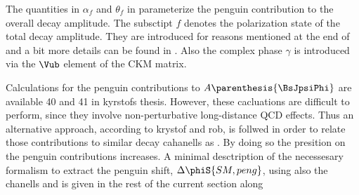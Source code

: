 \noindent The quantities in $\alpha_f$ and $\theta_f$ in  parameterize the penguin contribution to the overall \BsJpsiPhi
decay amplitude. The subsctipt $f$ denotes the polarization state of the total decay amplitude. They are introduced for reasons mentioned at the end
of  and a bit more details can be found in .
Also the complex phase $\gamma$ is introduced via the $\Vub$ element of the CKM matrix.

Calculations for the penguin contributions to $A \parenthesis{\BsJpsiPhi}$ are available {\color{red} 40 and 41 in kyrstofs thesis}.
However, these cacluations are difficult to perform, since they involve non-perturbative long-distance QCD effects. Thus an alternative
approach, according to {\color{red} krystof and rob}, is follwed in order to relate those contributions to similar decay cahanells
as \BsJpsiPhi. By doing so the presition on the penguin contributions increases. A minimal desctription of the necessesary formalism
to extract the penguin shift, $\Delta\phiS{SM,peng}$, using also the chanells \BsJpsiKst and \BsJpsiRho is given in the rest of the
current section along

